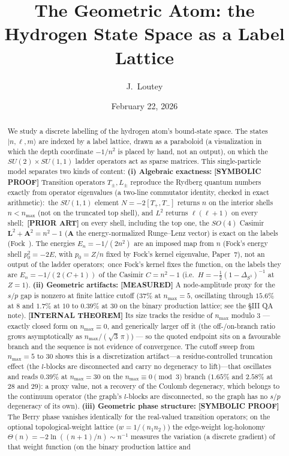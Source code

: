 \documentclass[aps,pra,twocolumn,superscriptaddress,longbibliography]{revtex4-2}
\newcommand{\gvc}[2]{#2}
\begin{document}
\title{The Geometric Atom: the Hydrogen State Space as a Label Lattice}

\author{J.~Loutey}

\date{February 22, 2026}

\begin{abstract}
We study a discrete labelling of the hydrogen atom's bound-state space. The states $|n,\ell,m\rangle$ are indexed by a label lattice, drawn as a paraboloid (a visualization in which the depth coordinate $-1/n^2$ is placed by hand, not an output), on which the $SU(2)\times SU(1,1)$ ladder operators act as sparse matrices. This single-particle model separates two kinds of content: \textbf{(i) Algebraic exactness:} \textbf{[SYMBOLIC PROOF]} \gvc{p1-ladder-exact}{Transition operators $T_\pm, L_\pm$ reproduce the Rydberg quantum numbers exactly from operator eigenvalues (a two-line commutator identity, checked in exact arithmetic):\ the $SU(1,1)$ element $N = -2[T_+, T_-]$ returns $n$ on the interior shells $n < n_{\max}$ (not on the truncated top shell), and $L^2$ returns $\ell(\ell+1)$ on every shell};\ \textbf{[PRIOR ART]} on every shell, including the top one, the $SO(4)$ Casimir $\mathbf{L}^2 + \mathbf{A}^2 = n^2 - 1$ ($\mathbf{A}$ the energy-normalized Runge--Lenz vector) is exact on the labels (Fock~\cite{fock1935}).  The energies $E_n = -1/(2n^2)$ are an imposed map from $n$ (Fock's energy shell $p_0^2 = -2E$, with $p_0 = Z/n$ fixed by Fock's kernel eigenvalue, Paper~7), not an output of the ladder operators;\ once Fock's kernel fixes the function, on the labels they are $E_n = -1/(2(C+1))$ of the Casimir $C = n^2-1$ (i.e.\ $H = -\tfrac12(1-\Delta_{S^3})^{-1}$ at $Z = 1$). \textbf{(ii) Geometric artifacts:} \textbf{[MEASURED]} A node-amplitude proxy for the $s/p$ gap is nonzero at finite lattice cutoff ($37\%$ at $n_{\max}=5$, oscillating through $15.6\%$ at $8$ and $1.7\%$ at $10$ to $0.39\%$ at $30$ on the binary production lattice; see the \S III QA note).  \textbf{[INTERNAL THEOREM]} Its size tracks the residue of $n_{\max}$ modulo $3$ --- exactly closed form on $n_{\max} \equiv 0$, and generically larger off it (the off-/on-branch ratio grows asymptotically as $n_{\max}/(\sqrt{3}\,\pi)$) --- so the quoted endpoint sits on a favourable branch and the sequence is not evidence of convergence. The cutoff sweep from $n_{\max}=5$ to 30 shows this is a discretization artifact---a residue-controlled truncation effect (the $l$-blocks are disconnected and carry no degeneracy to lift)---that oscillates and reads $0.39\%$ at $n_{\max}=30$ on the $n_{\max}\equiv 0 \pmod 3$ branch ($1.65\%$ and $2.58\%$ at $28$ and $29$): a proxy value, not a recovery of the Coulomb degeneracy, which belongs to the continuum operator (the graph's $l$-blocks are disconnected, so the graph has no $s/p$ degeneracy of its own). \textbf{(iii) Geometric phase structure:} \textbf{[SYMBOLIC PROOF]} The Berry phase vanishes identically for the real-valued transition operators; on the optional topological-weight lattice ($w = 1/(n_1 n_2)$) the edge-weight log-holonomy $\Theta(n) = -2\ln((n{+}1)/n) \sim n^{-1}$ measures the variation (a discrete gradient) of that weight function (on the binary production lattice and 
\end{abstract}
\end{document}
